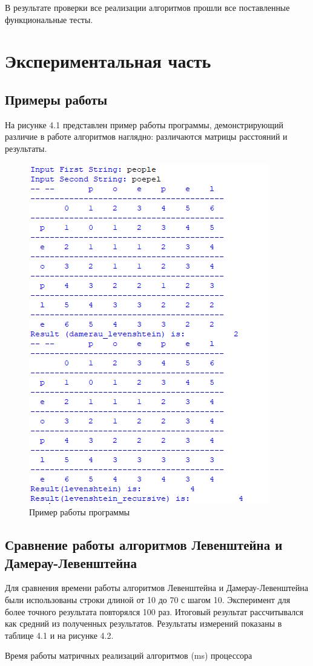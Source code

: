 \documentclass[12pt, a4paper]{report}
\begin{document}
	В результате проверки все реализации алгоритмов прошли все поставленные функциональные тесты.

	\chapter{Экспериментальная часть}
	\section{Примеры работы}
	На рисунке 4.1 представлен пример работы программы, демонстрирующий различие в работе алгоритмов наглядно: различаются матрицы расстояний и результаты.
	\begin{figure}[ht!]
		\centering
		\includegraphics[width=0.5\linewidth]{test.png}
		\caption{Пример работы программы}
		\label{fig:example}
	\end{figure}
	
	\section{Сравнение работы алгоритмов Левенштейна и Дамерау-Левенштейна}
	Для сравнения времени работы алгоритмов Левенштейна и Дамерау-Левенштейна были использованы строки длиной от 10 до 70 с шагом 10. Эксперимент для более точного результата повторялся 100 раз. Итоговый результат рассчитывался как средний из полученных результатов. Результаты измерений показаны в таблице 4.1 и на рисунке 4.2.\\
	\begin{table}[ht!]
		\caption{Время работы матричных реализаций алгоритмов (ms) процессора}
		\begin{center}
		\end{center}
	\end{table}
	
\end{document}
